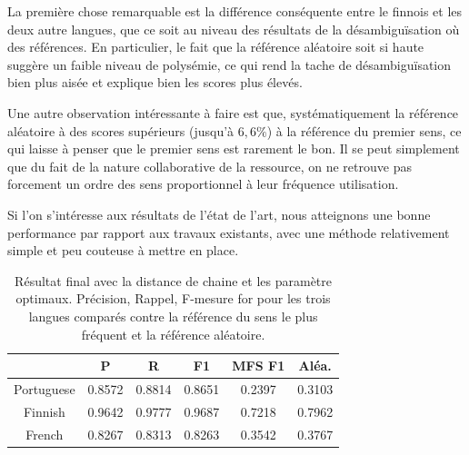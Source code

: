 \documentclass[10pt,a4paper,twoside]{article}
\begin{document}
La première chose remarquable est la différence conséquente entre le finnois et les deux autre langues, que ce soit au niveau des résultats de la désambiguïsation  où des références. En particulier, le fait que la référence aléatoire soit si haute suggère un faible niveau de polysémie, ce qui rend la tache de désambiguïsation bien plus aisée et explique bien les scores plus  élevés.

Une autre observation intéressante à faire est que, systématiquement la référence aléatoire à des scores supérieurs (jusqu'à \(6,6\%\)) à la référence du premier sens, ce qui laisse à penser que le premier sens est rarement le bon. Il se peut simplement que du fait de la nature collaborative de la ressource, on ne retrouve pas forcement un ordre des sens proportionnel à leur fréquence utilisation.

Si l'on s'intéresse aux résultats de l'état de l'art, nous atteignons une bonne performance par rapport aux travaux existants, avec une méthode relativement simple et peu couteuse à mettre en place.

\begin{table}
{\centering \footnotesize
\begin{tabular}{|c|c|c|c|c|c|}
\hline &P&R&F1&MFS F1&Aléa.\\
\hline Portuguese&0.8572&0.8814&0.8651&0.2397&0.3103\\
\hline Finnish&0.9642&0.9777&0.9687&0.7218&0.7962\\
\hline French&0.8267&0.8313&0.8263&0.3542&0.3767\\
\hline 
\end{tabular}
\caption{Résultat final avec la distance de chaine et les paramètre optimaux. Précision, Rappel, F-mesure for pour les trois langues comparés contre la référence du sens le plus fréquent et la référence aléatoire.}
\label{tab:final}
}
\end{table} 
\end{document}
